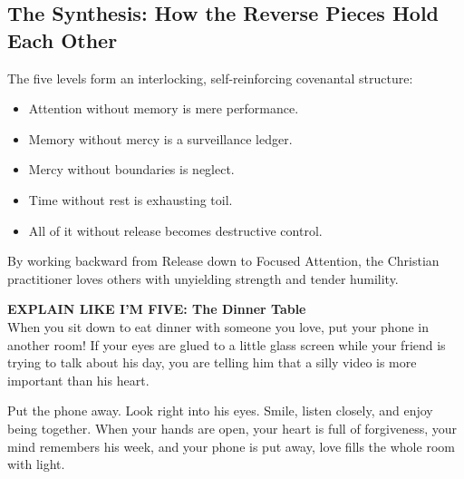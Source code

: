 \documentclass[11pt,twocolumn]{article}
\begin{document}
\subsection{The Synthesis: How the Reverse Pieces Hold Each Other}
The five levels form an interlocking, self-reinforcing covenantal structure:
\begin{itemize}
    \item Attention without memory is mere performance.
    \item Memory without mercy is a surveillance ledger.
    \item Mercy without boundaries is neglect.
    \item Time without rest is exhausting toil.
    \item All of it without release becomes destructive control.
\end{itemize}

By working backward from Release down to Focused Attention, the Christian practitioner loves others with unyielding strength and tender humility.

\begin{eli5box}
\textbf{EXPLAIN LIKE I'M FIVE: The Dinner Table}\\
When you sit down to eat dinner with someone you love, put your phone in another room! If your eyes are glued to a little glass screen while your friend is trying to talk about his day, you are telling him that a silly video is more important than his heart. 

Put the phone away. Look right into his eyes. Smile, listen closely, and enjoy being together. When your hands are open, your heart is full of forgiveness, your mind remembers his week, and your phone is put away, love fills the whole room with light.
\end{eli5box}
\end{document}
